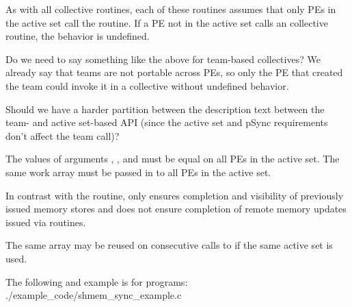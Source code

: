 \begin{apidefinition}
{    As with all \openshmem collective routines, each of these routines assumes
    that only \acp{PE} in the active set call the routine.  If a \ac{PE} not in
    the active set calls an \openshmem collective routine, the behavior is undefined.

    \begin{FeedbackRequest}
      Do we need to say something like the above for team-based collectives?
      We already say that teams are not portable across PEs, so only the PE
      that created the team could invoke it in a collective without undefined
      behavior.

      Should we have a harder partition between the description text between
      the team- and active set-based API (since the active set and pSync
      requirements don't affect the team call)?
    \end{FeedbackRequest}
    
    The values of arguments , , and
     must be equal on all \acp{PE} in the active set.  The same
    work array must be passed in  to all \acp{PE} in the active set.

    In contrast with the  routine,  only
    ensures completion and visibility of previously issued memory stores and does not ensure
    completion of remote memory updates issued via \openshmem routines.

    The same  array may be reused on consecutive calls to
     if the same active set is used.
}



\begin{apiexamples}

\apicexample
    {The following  and  example is
    for \Cstd[11] programs:}
    {./example_code/shmem_sync_example.c}
    {}

\end{apiexamples}

\end{apidefinition}
